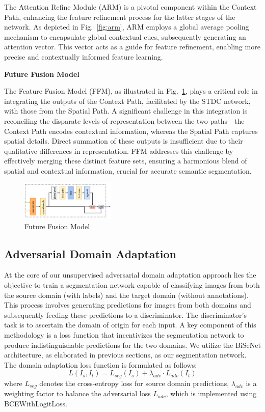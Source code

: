 \documentclass[conference]{IEEEtran}
\begin{document}
The Attention Refine Module (ARM) is a pivotal component within the Context Path, enhancing the feature refinement process for the latter stages of the network. As depicted in Fig.~\ref{fig:arm}, ARM employs a global average pooling mechanism to encapsulate global contextual cues, subsequently generating an attention vector. This vector acts as a guide for feature refinement, enabling more precise and contextually informed feature learning.

\textbf{Future Fusion Model}

The Feature Fusion Model (FFM), as illustrated in Fig.~\ref{fig:ffm}, plays a critical role in integrating the outputs of the Context Path, facilitated by the STDC network, with those from the Spatial Path. A significant challenge in this integration is reconciling the disparate levels of representation between the two paths—the Context Path encodes contextual information, whereas the Spatial Path captures spatial details. Direct summation of these outputs is insufficient due to their qualitative differences in representation. FFM addresses this challenge by effectively merging these distinct feature sets, ensuring a harmonious blend of spatial and contextual information, crucial for accurate semantic segmentation.

\begin{figure}[tp]
\centerline{\includegraphics[width=0.4\textwidth]{figures/FFM}}
\caption{Future Fusion Model}
\label{fig:ffm}
\end{figure}

\subsection{Adversarial Domain Adaptation}

At the core of our unsupervised adversarial domain adaptation approach \cite{b3} lies the objective to train a segmentation network capable of classifying images from both the source domain (with labels) and the target domain (without annotations). This process involves generating predictions for images from both domains and subsequently feeding these predictions to a discriminator. The discriminator's task is to ascertain the domain of origin for each input. A key component of this methodology is a loss function that incentivizes the segmentation network to produce indistinguishable predictions for the two domains. We utilize the BiSeNet architecture, as elaborated in previous sections, as our segmentation network. The domain adaptation loss function is formulated as follows:
\begin{equation}
L(I_s,I_t) = L_{seg}(I_s) + \lambda_{adv} \cdot L_{adv}(I_t)
\end{equation}
where $L_{seg}$ denotes the cross-entropy loss for source domain predictions, $\lambda_{adv}$ is a weighting factor to balance the adversarial loss $L_{adv}$, which is implemented using BCEWithLogitLoss.
\end{document}
